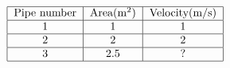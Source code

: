 $$
\begin{tabular}{|c| c| c|}
\hline
{Pipe number} & {Area(m$^2$)} & {Velocity(m/s)} \\
\hline 
   1  & 1 & 1 \\ \hline
   2  & 2 & 2\\ \hline
   3 & 2.5 & ? \\ \hline
   \end{tabular} $$\\